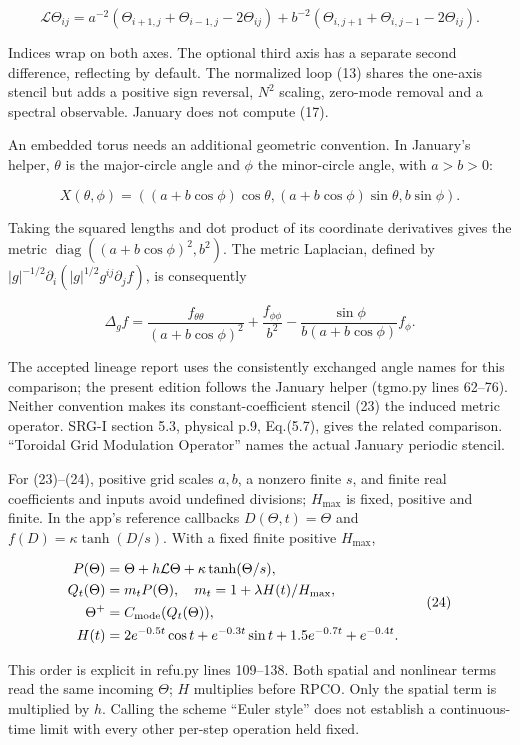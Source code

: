\documentclass[11pt,a4paper]{article}
\begin{document}
\[
\mathcal L\Theta_{ij}=
a^{-2}(\Theta_{i+1,j}+\Theta_{i-1,j}-2\Theta_{ij})
+b^{-2}(\Theta_{i,j+1}+\Theta_{i,j-1}-2\Theta_{ij}). \tag{23}
\]

Indices wrap on both axes. The optional third axis has a separate second difference, reflecting by default. The normalized loop (13) shares the one-axis stencil but adds a positive sign reversal, $N^2$ scaling, zero-mode removal and a spectral observable. January does not compute (17).


An embedded torus needs an additional geometric convention. In January's helper, $\theta$ is the major-circle angle and $\phi$ the minor-circle angle, with $a>b>0$:


\[
X(\theta,\phi)=((a+b\cos\phi)\cos\theta,(a+b\cos\phi)\sin\theta,b\sin\phi).
\]

Taking the squared lengths and dot product of its coordinate derivatives gives the metric $\operatorname{diag}((a+b\cos\phi)^2,b^2)$. The metric Laplacian, defined by $|g|^{-1/2}\partial_i(|g|^{1/2}g^{ij}\partial_j f)$, is consequently


\[
\Delta_g f=\frac{f_{\theta\theta}}{(a+b\cos\phi)^2}
+\frac{f_{\phi\phi}}{b^2}
-\frac{\sin\phi}{b(a+b\cos\phi)}f_\phi.
\]

The accepted lineage report uses the consistently exchanged angle names for this comparison; the present edition follows the January helper (tgmo.py lines 62--76). Neither convention makes its constant-coefficient stencil (23) the induced metric operator. SRG-I section 5.3, physical p.9, Eq.(5.7), gives the related comparison. ``Toroidal Grid Modulation Operator'' names the actual January periodic stencil.


For (23)--(24), positive grid scales $a,b$, a nonzero finite $s$, and finite real coefficients and inputs avoid undefined divisions; $H_{\max}$ is fixed, positive and finite. In the app's reference callbacks $D(\Theta,t)=\Theta$ and $f(D)=\kappa\tanh(D/s)$. With a fixed finite positive $H_{\max}$,


\[
\begin{aligned}
P(\Theta)&=\Theta+h\mathcal L\Theta+\kappa\tanh(\Theta/s),\\
Q_t(\Theta)&=m_tP(\Theta),\quad m_t=1+\lambda H(t)/H_{\max},\\
\Theta^+&=C_{\rm mode}(Q_t(\Theta)),\\
H(t)&=2e^{-0.5t}\cos t+e^{-0.3t}\sin t+1.5e^{-0.7t}+e^{-0.4t}.
\end{aligned} \tag{24}
\]

This order is explicit in refu.py lines 109--138. Both spatial and nonlinear terms read the same incoming $\Theta$; $H$ multiplies before RPCO. Only the spatial term is multiplied by $h$. Calling the scheme ``Euler style'' does not establish a continuous-time limit with every other per-step operation held fixed.
\end{document}
